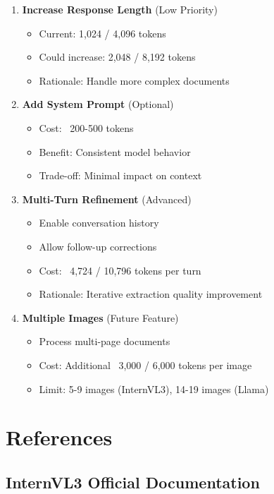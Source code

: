 \documentclass[11pt,a4paper]{article}
\begin{document}
\begin{enumerate}[leftmargin=*]
    \item \textbf{Increase Response Length} (Low Priority)
    \begin{itemize}
        \item Current: 1,024 / 4,096 tokens
        \item Could increase: 2,048 / 8,192 tokens
        \item Rationale: Handle more complex documents
    \end{itemize}

    \item \textbf{Add System Prompt} (Optional)
    \begin{itemize}
        \item Cost: ~200-500 tokens
        \item Benefit: Consistent model behavior
        \item Trade-off: Minimal impact on context
    \end{itemize}

    \item \textbf{Multi-Turn Refinement} (Advanced)
    \begin{itemize}
        \item Enable conversation history
        \item Allow follow-up corrections
        \item Cost: ~4,724 / 10,796 tokens per turn
        \item Rationale: Iterative extraction quality improvement
    \end{itemize}

    \item \textbf{Multiple Images} (Future Feature)
    \begin{itemize}
        \item Process multi-page documents
        \item Cost: Additional ~3,000 / 6,000 tokens per image
        \item Limit: 5-9 images (InternVL3), 14-19 images (Llama)
    \end{itemize}
\end{enumerate}

\section{References}

\subsection{InternVL3 Official Documentation}
\end{document}
